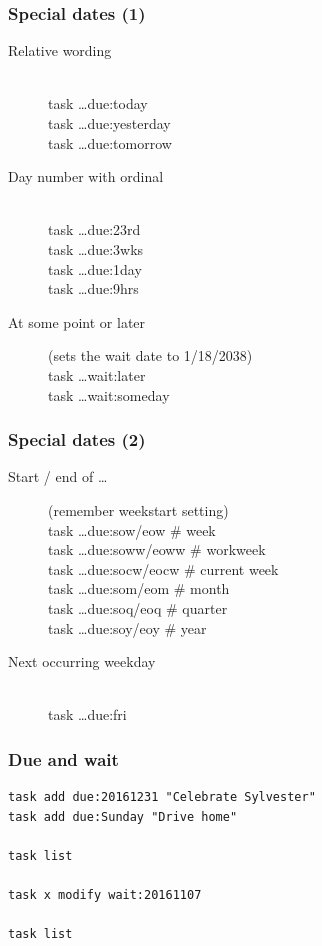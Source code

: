 \documentclass[t,handout]{beamer}
\begin{document}
\begin{frame}[fragile]\frametitle{Special dates (1)}
    \vfill
    \begin{description}
    \item[Relative wording] \hfill \\
        task \ldots due:today \\
        task \ldots due:yesterday \\
        task \ldots due:tomorrow \\
    \item[Day number with ordinal] \hfill \\
        task \ldots due:23rd \\
        task \ldots due:3wks \\
        task \ldots due:1day \\
        task \ldots due:9hrs \\
    \item[At some point or later] (sets the wait date to 1/18/2038) \hfill \\
        task \ldots wait:later \\
        task \ldots wait:someday
    \end{description}
\end{frame}

\begin{frame}[fragile]\frametitle{Special dates (2)}
    \vfill
    \begin{description}
        \item[Start / end of \ldots] (remember weekstart setting) \hfill \\
            task \ldots due:sow/eow \# week \\
            task \ldots due:soww/eoww \# workweek \\
            task \ldots due:socw/eocw \# current week \\
            task \ldots due:som/eom \# month \\
            task \ldots due:soq/eoq \# quarter \\
            task \ldots due:soy/eoy \# year \\
        \item[Next occurring weekday] \hfill \\
            task \ldots due:fri
    \end{description}
\end{frame}

\begin{frame}[fragile]\frametitle{Due and wait}
    \vfill
    \begin{lstlisting}
task add due:20161231 "Celebrate Sylvester"
task add due:Sunday "Drive home"

task list

task x modify wait:20161107

task list\end{lstlisting}
\end{frame}
\end{document}
